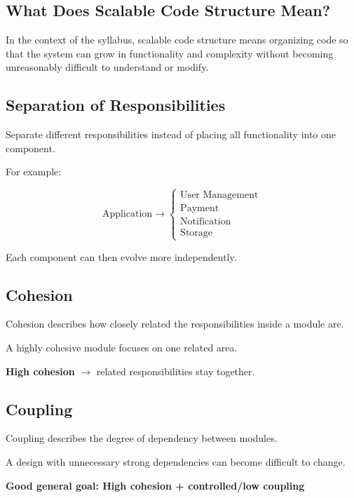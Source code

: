 \documentclass[11pt,a4paper]{article}
\begin{document}
\subsection{What Does Scalable Code Structure Mean?}

In the context of the syllabus, scalable code structure means organizing code
so that the system can grow in functionality and complexity without becoming
unreasonably difficult to understand or modify.

\subsection{Separation of Responsibilities}

Separate different responsibilities instead of placing all functionality into
one component.

For example:

\[
\text{Application}
\rightarrow
\begin{cases}
\text{User Management}\\
\text{Payment}\\
\text{Notification}\\
\text{Storage}
\end{cases}
\]

Each component can then evolve more independently.

\subsection{Cohesion}

Cohesion describes how closely related the responsibilities inside a module
are.

A highly cohesive module focuses on one related area.

\begin{center}
\textbf{High cohesion} $\rightarrow$ related responsibilities stay together.
\end{center}

\subsection{Coupling}

Coupling describes the degree of dependency between modules.

A design with unnecessary strong dependencies can become difficult to change.

\begin{center}
\textbf{Good general goal: High cohesion + controlled/low coupling}
\end{center}
\end{document}
